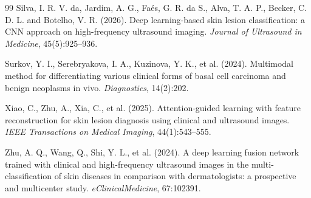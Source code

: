 \documentclass[12pt]{article}
\begin{document}
\begin{thebibliography}{99}
 Silva, I. R. V. da, Jardim, A. G., Fa\'es, G. R. da S., Alva, T. A. P., Becker, C. D. L. and Botelho, V. R. (2026). Deep learning-based skin lesion classification: a CNN approach on high-frequency ultrasound imaging. \textit{Journal of Ultrasound in Medicine}, 45(5):925--936.

 Surkov, Y. I., Serebryakova, I. A., Kuzinova, Y. K., et al. (2024). Multimodal method for differentiating various clinical forms of basal cell carcinoma and benign neoplasms in vivo. \textit{Diagnostics}, 14(2):202.

 Xiao, C., Zhu, A., Xia, C., et al. (2025). Attention-guided learning with feature reconstruction for skin lesion diagnosis using clinical and ultrasound images. \textit{IEEE Transactions on Medical Imaging}, 44(1):543--555.

 Zhu, A. Q., Wang, Q., Shi, Y. L., et al. (2024). A deep learning fusion network trained with clinical and high-frequency ultrasound images in the multi-classification of skin diseases in comparison with dermatologists: a prospective and multicenter study. \textit{eClinicalMedicine}, 67:102391.
\end{thebibliography}
\end{document}
